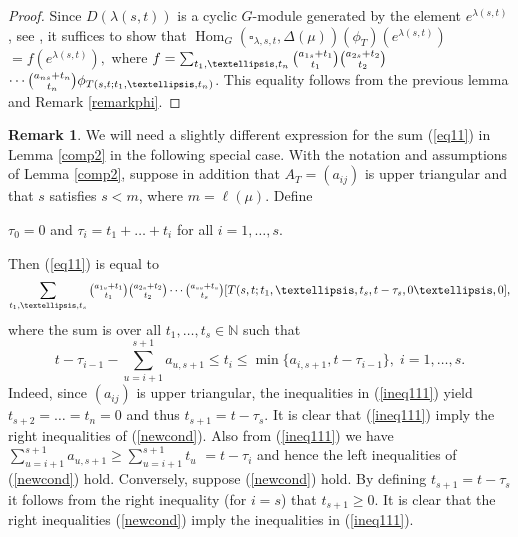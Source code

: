 \documentclass[11pt]{article}
\theoremstyle{definition}
\newtheorem{rema}[theo]{Remark}
\numberwithin{equation}{section}
\newcommand{\la}{\lambda}
\DeclareMathOperator{\Hom}{Hom}
\numberwithin{equation}{section}
\begin{document}
\begin{proof}
	Since $D(\la(s,t))$ is a cyclic $G$-module generated by the element $e^{\la(s,t)}$,  see \cite[Theorem A4]{SY}, it suffices to show that $\Hom_G(\square_{\la, s, t},\Delta({\mu}))(\phi_T)(e^{\la(s,t)})$$=f(e^{\la(s,t)}),$ where $f=\sum_{t_1,\dots,t_{n}}\tbinom{a_{1s}+t_1}{t_1}\tbinom{a_{2s}+t_2}{t_2} $ $\cdots \tbinom{a_{ns}+t_n}{t_n}\phi_{T(s,t;t_1,\dots,t_{n})}$. This equality follows from the previous lemma and Remark \ref{remarkphi}.
\end{proof}

\begin{rema}\label{remnewcond}	We will need a slightly different expression for the sum (\ref{eq11}) in Lemma \ref{comp2} in the following special case. With the notation and assumptions of Lemma \ref{comp2}, suppose in addition that $A_T=(a_{ij})$ is upper triangular and that $s$ satisfies $s<m$, where $m =\ell(\mu)$. Define \begin{center}
		$\tau_0=0$ and $\tau_i=t_1+\dots+t_i$ for all $i=1,\dots,s.$
	\end{center} Then (\ref{eq11}) is equal to  
	\begin{equation}\label{newsum}
		\sum_{t_1,\dots,t_{s}}\tbinom{a_{1s}+t_1}{t_1}\tbinom{a_{2s}+t_2}{t_2} \cdots \tbinom{a_{ss}+t_s}{t_s}[T(s,t;t_1,\dots,t_{s},t-\tau_s,0\dots,0],\end{equation} where the sum is over all $t_1,\dots,t_s \in \mathbb{N}$ such that 
	\begin{equation}\label{newcond}
		t-\tau_{i-1}-\sum_{u=i+1}^{s+1}a_{u,s+1} \le t_i \le \min\{a_{i,s+1}, t-\tau_{i-1}\}, \; i=1,\dots,s.
	\end{equation}
	Indeed, since $(a_{ij})$ is upper triangular, the inequalities in (\ref{ineq111}) yield $t_{s+2}=\dots=t_n=0$ and thus $t_{s+1}=t-\tau_{s}$. It is clear that (\ref{ineq111}) imply the right inequalities of (\ref{newcond}). Also from (\ref{ineq111}) we have $\sum_{u=i+1}^{s+1}a_{u,s+1} \ge \sum_{u=i+1}^{s+1}t_{u}$ $=t-\tau_i$ and hence the left inequalities of (\ref{newcond}) hold. Conversely, suppose (\ref{newcond}) hold. By defining $t_{s+1}=t-\tau_s$ it follows from the right inequality (for $i=s$) that $t_{s+1} \ge 0$. It is clear that the right inequalities (\ref{newcond}) imply the inequalities in (\ref{ineq111}).
	\end{rema} 
\end{document}
